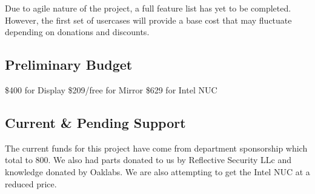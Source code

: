 Due to agile nature of the project, a full feature list has yet to be completed. However, the first set of usercases will provide a base cost that may fluctuate depending on donations and discounts.

\subsection{Preliminary Budget}
\$400 for Display\newline
\$209/free for Mirror\newline
\$629 for Intel NUC\newline

\subsection{Current \& Pending Support}
The current funds for this project have come from department sponsorship which total to 800. We also had parts donated to us by Reflective Security LLc and knowledge donated by Oaklabs. We are also attempting to get the Intel NUC at a reduced price.